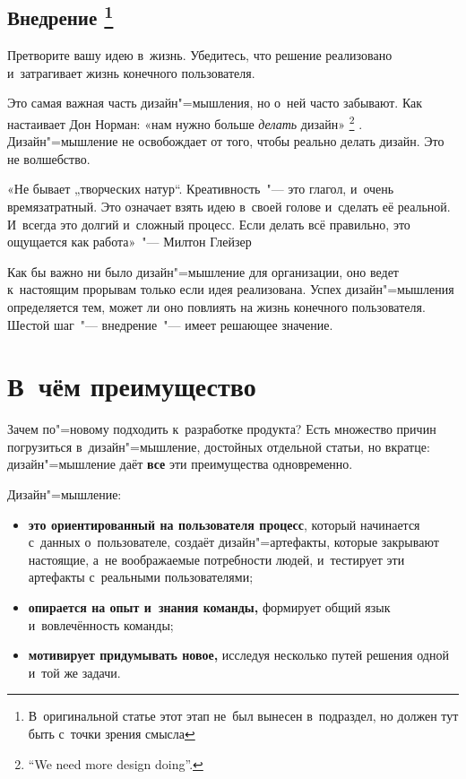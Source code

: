 \documentclass[12pt]{article}
\begin{document}
\subsection*{%
	Внедрение%
	\footnote{%
		В~оригинальной статье этот этап не~был вынесен в~подраздел,
		но должен тут быть с~точки зрения смысла
	}%
}

Претворите вашу идею в~жизнь. Убедитесь, что решение реализовано и~затрагивает жизнь конечного пользователя.

Это самая важная часть дизайн"=мышления, но о~ней часто забывают. Как настаивает Дон Норман: «нам нужно больше \emph{делать} дизайн»%
\footnote{%
	``We need more design doing''.%
}%
. Дизайн"=мышление не освобождает от того, чтобы реально делать дизайн. Это не волшебство. 
\par

\begin{leftbar}
	«Не бывает „творческих натур“. Креативность~"--- это глагол,
	и~очень времязатратный. Это означает взять идею в~своей
	голове и~сделать её реальной. И~всегда это долгий и~сложный
	процесс. Если делать всё правильно, это ощущается как
	работа»~"--- Милтон Глейзер%
\end{leftbar}

Как бы важно ни было дизайн"=мышление для организации, оно ведет к~настоящим прорывам только если идея реализована. Успех дизайн"=мышления определяется тем, может ли оно повлиять на жизнь конечного пользователя. Шестой шаг~"--- внедрение~"--- имеет решающее значение.  

\section{В~чём преимущество}

Зачем по"=новому подходить к~разработке продукта? Есть множество причин погрузиться в~дизайн"=мышление, достойных отдельной статьи, но вкратце: дизайн"=мышление даёт \textbf{все} эти преимущества одновременно.

Дизайн"=мышление:
\begin{itemize}

	\item\textbf{это ориентированный на пользователя процесс}, который начинается с~данных о~пользователе, создаёт дизайн"=артефакты, которые закрывают настоящие, а~не воображаемые потребности людей, и~тестирует эти артефакты с~реальными пользователями;

	\item\textbf{опирается на опыт и~знания команды,} формирует общий язык и~вовлечённость команды;

	\item\textbf{мотивирует придумывать новое,} исследуя несколько путей решения одной и~той же задачи.
\end{itemize}
\end{document}
